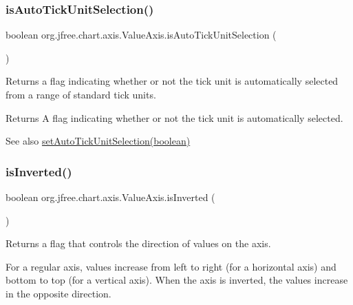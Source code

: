 \subsubsection{\texorpdfstring{is\+Auto\+Tick\+Unit\+Selection()}{isAutoTickUnitSelection()}}
{\footnotesize\ttfamily boolean org.\+jfree.\+chart.\+axis.\+Value\+Axis.\+is\+Auto\+Tick\+Unit\+Selection (\begin{DoxyParamCaption}{ }\end{DoxyParamCaption})}

Returns a flag indicating whether or not the tick unit is automatically selected from a range of standard tick units.

\begin{DoxyReturn}{Returns}
A flag indicating whether or not the tick unit is automatically selected.
\end{DoxyReturn}
\begin{DoxySeeAlso}{See also}
\mbox{\hyperlink{classorg_1_1jfree_1_1chart_1_1axis_1_1_value_axis_a7366393f75b07420136f449d351deb08}{set\+Auto\+Tick\+Unit\+Selection(boolean)}} 
\end{DoxySeeAlso}
\mbox{\label{classorg_1_1jfree_1_1chart_1_1axis_1_1_value_axis_a61493fa28db9f869172d67b1205e2793}} 
\subsubsection{\texorpdfstring{is\+Inverted()}{isInverted()}}
{\footnotesize\ttfamily boolean org.\+jfree.\+chart.\+axis.\+Value\+Axis.\+is\+Inverted (\begin{DoxyParamCaption}{ }\end{DoxyParamCaption})}

Returns a flag that controls the direction of values on the axis. 

For a regular axis, values increase from left to right (for a horizontal axis) and bottom to top (for a vertical axis). When the axis is \textquotesingle{}inverted\textquotesingle{}, the values increase in the opposite direction.


